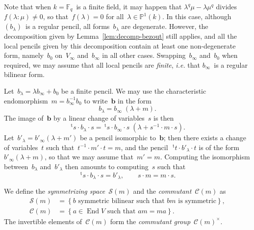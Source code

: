 \documentclass{lms}%
\let\ro\mathscr
\def\transpose{\,{}^{\mathrm{t}\!}}
\def\acco#1{\left\{#1\right\}}
\DeclareMathOperator\End{End}
\def\F{\mathbb{F}}
\begin{document}
\medskip

Note that when $k = \F_q$~is a finite field, it may happen that $λ^q μ -
λ μ^q$ divides~$f(λ:μ) ≠ 0$, so that~$f(λ) = 0$ for all~$λ ∈ ℙ^1(k)$. In
this case, although $(b_{λ})$~is a regular pencil, all forms~$b_{λ}$ are
degenerate. However, the decomposition given by
Lemma~\ref{lem:decomp-bezout} still applies, and all the local pencils
given by this decomposition contain at least one non-degenerate form,
namely~$b_{0}$ on~$V_{∞}$ and~$b_{∞}$ in all other cases.
Swapping~$b_{∞}$ and~$b_{0}$ when required, we may assume that all local
pencils are \emph{finite}, \emph{i.e.} that $b_{∞}$~is a regular bilinear
form.

\bigskip

Let~$b_{λ} = λ b_{∞} + b_0$ be a finite pencil. We may use the
characteristic endomorphism~$m = b_{∞}^{-1}b_0$ to write~$\bm{b}$ in the form
\begin{equation}\label{eq:adjoint}
b_{λ} = b_{∞}\;(λ + m).
\end{equation}
The image of~$\bm{b}$ by a linear change of variables~$s$ is then
\begin{equation}\label{eq:adjoint-change}
\transpose{s} · b_{λ} · s = 
  \transpose{s} · b_{∞} · s\; ( λ + s^{-1} · m · s).
\end{equation}
Let~$b'_{λ} = b'_{∞} (λ + m')$ be a pencil isomorphic to~$\bm{b}$; then there
exists a change of variables~$t$ such that~$t^{-1} · m' · t = m$, and the
pencil~$\transpose{t} · b'_{λ} · t$ is of the form $b'_{∞} (λ + m)$, so
that we may assume that~$m' = m$. Computing the isomorphism
between~$b_{λ}$ and~$b'_{λ}$ then amounts to computing~$s$ such that
\begin{equation}
\transpose{s} · b_{λ} · s = b'_{λ}, \qquad s · m = m · s.
\end{equation}

We define the \emph{symmetrizing
space}~$\ro S(m)$ and the \emph{commutant}~$\ro C(m)$ as
\begin{equation}\begin{split}
\ro S(m) &= \acco{\text{$b$ symmetric bilinear such that $bm$~is symmetric} },\\
\ro C(m) &= \acco{\text{$a ∈ \End V$ such that~$am = ma$}}.
\end{split}\end{equation}
The invertible elements of~$\ro C(m)$ form the \emph{commutant
group}~$\ro C(m)^{×}$.
\end{document}
